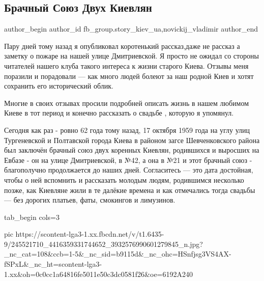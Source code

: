  
 
 
 
 
 
\subsection{Брачный Союз Двух Киевлян}
\label{sec:17_10_2021.fb.fb_group.story_kiev_ua.1.brachnyj_sojuz_dvuh_kievljan}
 
\ifcmt
 author_begin
   author_id fb_group.story_kiev_ua,novickij_vladimir
 author_end
\fi

Пару дней тому назад я опубликовал коротенький рассказ,даже не рассказ а
заметку о пожаре на нашей улице Дмитриевской.  Я просто не ожидал со стороны
читателей нашего  клуба такого интереса к жизни старого Киева. Отзывы меня
поразили и порадовали — как много людей болеют за наш родной Киев и хотят
сохранить его исторический облик. 


Многие в своих отзывах просили подробней описать жизнь в нашем любимом Киеве в
тот период и конечно рассказать о свадьбе , которую я упомянул. 

Сегодня  как  раз - ровно  62 года тому назад, 17 октября
1959 года на углу улиц Тургеневской и Полтавской города Киева   в районом загсе
Шевченковского района был заключён брачный союз двух коренных Киевлян,
родившихся  и выросших на Евбазе - он  на улице Дмитриевской,  в №42, а она в
№21 и этот брачный союз - благополучно продолжается до наших дней. Согласитесь
— это  дата достойная, чтобы о ней вспомнить и рассказать молодым людям,
родившимся  несколько позже, как  Киевляне  жили в те далёкие  времена и как
отмечались  тогда свадьбы — без дорогих платьев,  фаты, смокингов и лимузинов.

\ifcmt
  tab_begin cols=3

     pic https://scontent-lga3-1.xx.fbcdn.net/v/t1.6435-9/245521710_4416359331744652_3932576990601279845_n.jpg?_nc_cat=108&ccb=1-5&_nc_sid=b9115d&_nc_ohc=HSnfjsg3VS4AX-fSPxL&_nc_ht=scontent-lga3-1.xx&oh=0c0cc1a64816fe5011e50c3dc0581f26&oe=6192A240

